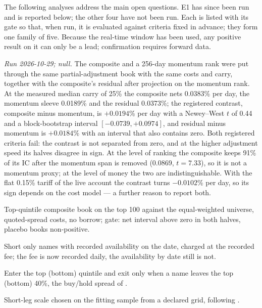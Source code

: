 The following analyses address the main open questions. E1 has since been run and is reported below; the other four have not been run. Each is listed with its gate so that, when run, it is evaluated against criteria fixed in advance; they form one family of five. Because the real-time window has been used, any positive result on it can only be a lead; confirmation requires forward data.
\begin{description}[leftmargin=2.2em,style=nextline]
\item[E1. Information beyond momentum.] \emph{Run 2026-10-29; null.} The composite and a 256-day momentum rank were put through the same partial-adjustment book with the same costs and carry, together with the composite's residual after projection on the momentum rank. At the measured median carry of 25\% the composite nets 0.0383\% per day, the momentum sleeve 0.0189\% and the residual 0.0373\%; the registered contrast, composite minus momentum, is $+0.0194$\% per day with a Newey--West $t$ of 0.44 and a block-bootstrap interval $[-0.0739,+0.0974]$, and residual minus momentum is $+0.0184$\% with an interval that also contains zero. Both registered criteria fail: the contrast is not separated from zero, and at the higher adjustment speed its halves disagree in sign. At the level of ranking the composite keeps 91\% of its IC after the momentum span is removed (0.0869, $t=7.33$), so it is not a momentum proxy; at the level of money the two are indistinguishable. With the flat 0.15\% tariff of the live account the contrast turns $-0.0102$\% per day, so its sign depends on the cost model --- a further reason to report both.
\item[E2. Long-only implementation.] Top-quintile composite book on the top 100 against the equal-weighted universe, quoted-spread costs, no borrow; gate: net interval above zero in both halves, placebo books non-positive.
\item[E3. Borrow-feasible short leg.] Short only names with recorded availability on the date, charged at the recorded fee; the fee is now recorded daily, the availability by date still is not.
\item[E4. Hold bands.] Enter the top (bottom) quintile and exit only when a name leaves the top (bottom) 40\%, the buy/hold spread of \citet{novymarx2016}.
\item[E5. Scaled short exposure.] Short-leg scale chosen on the fitting sample from a declared grid, following \citet{jacobs1998}.
\end{description}

